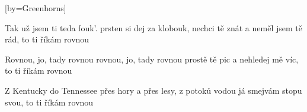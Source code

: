 [by={Greenhorns}]

\beginverse{}
Tak už jsem ti teda fouk'. 
prsten si dej za klobouk,
nechci tě znát a neměl jsem tě rád,
to ti říkám rovnou
\endverse{}

\beginchorus{}
Rovnou, jo, tady rovnou 
rovnou, jo, tady rovnou
prostě tě pic a nehledej mě víc,
to ti říkám rovnou
\endchorus{}

\beginverse{}
Z Kentucky do Tennessee 
přes hory a přes lesy,
z potoků vodou já smejvám stopu svou,
to ti říkám rovnou
\endverse{}

\beginchorus{}
\phantom{}
\endchorus{}

\endsong{}
